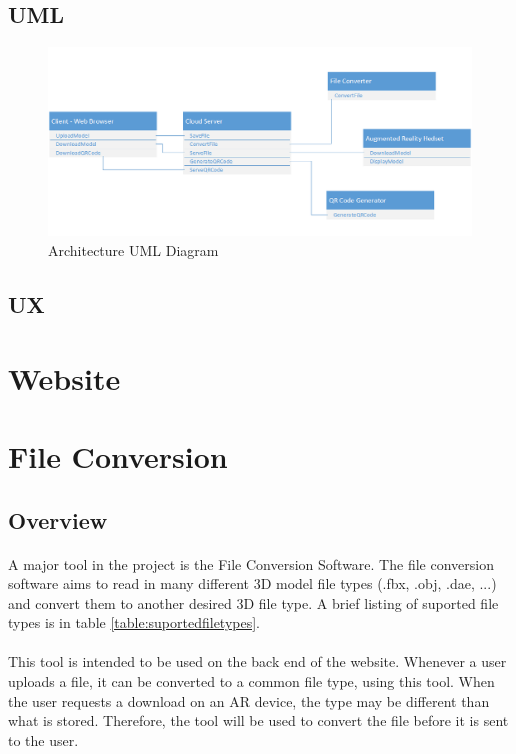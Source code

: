  \subsection{UML}
    
   \begin{figure}[H]
   	\centering
   	\includegraphics[width=\textwidth]{UML.png}
   	\caption{Architecture UML Diagram} 	
   \end{figure}
   
 \subsection{UX}

 \section{Website}

 \section{File Conversion}

    \subsection{Overview}
    \paragraph{}
    A major tool in the project is the File Conversion Software.  
    The file conversion software aims to read in many different 3D model file types (.fbx, .obj, .dae, ...) and convert them to another desired 3D file type.  
    A brief listing of suported file types is in table \ref{table:suportedfiletypes}.

    \paragraph{}
    This tool is intended to be used on the back end of the website.  Whenever a user uploads a file, it can be converted to a common file type, using this tool.
    When the user requests a download on an AR device, the type may be different than what is stored.  Therefore, the tool will be used to convert the file before
    it is sent to the user.

